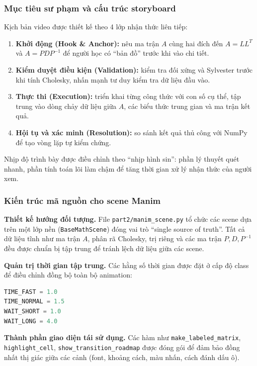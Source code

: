 \documentclass[a4paper]{article}
\begin{document}
\subsubsection{Mục tiêu sư phạm và cấu trúc storyboard}

Kịch bản video được thiết kế theo 4 lớp nhận thức liên tiếp:
\begin{enumerate}
    \item \textbf{Khởi động (Hook \& Anchor):} nêu ma trận $A$ cùng hai đích đến $A=LL^T$ và $A=PDP^{-1}$ để người học có ``bản đồ'' trước khi vào chi tiết.
    \item \textbf{Kiểm duyệt điều kiện (Validation):} kiểm tra đối xứng và Sylvester trước khi tính Cholesky, nhấn mạnh tư duy kiểm tra dữ liệu đầu vào.
    \item \textbf{Thực thi (Execution):} triển khai từng công thức với con số cụ thể, tập trung vào dòng chảy dữ liệu giữa $A$, các biểu thức trung gian và ma trận kết quả.
    \item \textbf{Hội tụ và xác minh (Resolution):} so sánh kết quả thủ công với NumPy để tạo vòng lặp tự kiểm chứng.
\end{enumerate}

Nhịp độ trình bày được điều chỉnh theo ``nhịp hình sin'': phần lý thuyết quét nhanh, phần tính toán lõi làm chậm để tăng thời gian xử lý nhận thức của người xem.

\subsubsection{Kiến trúc mã nguồn cho scene Manim}

\textbf{Thiết kế hướng đối tượng.} File \texttt{part2/manim\_scene.py} tổ chức các scene dựa trên một lớp nền (\texttt{BaseMathScene}) đóng vai trò ``single source of truth''. Tất cả dữ liệu tĩnh như ma trận $A$, phân rã Cholesky, trị riêng và các ma trận $P,D,P^{-1}$ đều được chuẩn bị tập trung để tránh lệch dữ liệu giữa các scene.

\textbf{Quản trị thời gian tập trung.} Các hằng số thời gian được đặt ở cấp độ class để điều chỉnh đồng bộ toàn bộ animation:
\begin{lstlisting}[language=Python, basicstyle=\ttfamily\small, commentstyle=\itshape\color{gray}, breaklines=true]
TIME_FAST = 1.0
TIME_NORMAL = 1.5
WAIT_SHORT = 1.0
WAIT_LONG = 4.0
\end{lstlisting}

\textbf{Thành phần giao diện tái sử dụng.} Các hàm như \texttt{make\_labeled\_matrix}, \texttt{highlight\_cell}, \texttt{show\_transition\_roadmap} được đóng gói để đảm bảo đồng nhất thị giác giữa các cảnh (font, khoảng cách, màu nhấn, cách đánh dấu ô).
\end{document}
